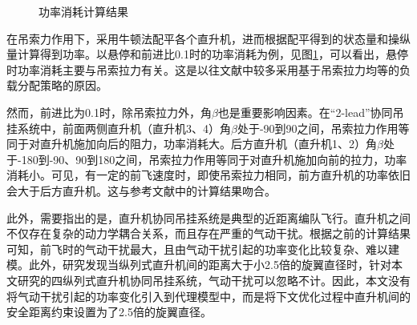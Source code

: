 \begin{figure}[!htb]
  \quad
  \caption{功率消耗计算结果}
  \label{fig:4_2_1}
\end{figure}

在吊索力作用下，采用牛顿法配平各个直升机，进而根据配平得到的状态量和操纵量计算得到功率。以悬停和前进比0.1时的功率消耗为例，见图\ref{fig:4_2_1}，可以看出，悬停时功率消耗主要与吊索拉力有关。这是以往文献中较多采用基于吊索拉力均等的负载分配策略的原因。

然而，前进比为0.1时，除吊索拉力外，角$\beta$也是重要影响因素。在“2-lead”协同吊挂系统中，前面两侧直升机（直升机3、4）角$\beta$处于-90\degree 到90\degree 之间，吊索拉力作用等同于对直升机施加向后的阻力，功率消耗大。后方直升机（直升机1、2）角$\beta$处于-180\degree 到-90\degree、90\degree 到180\degree 之间，吊索拉力作用等同于对直升机施加向前的拉力，功率消耗小。可见，有一定的前飞速度时，即使吊索拉力相同，前方直升机的功率依旧会大于后方直升机。这与参考文献\cite{enciu2017flight,song2013modeling}中的计算结果吻合。

此外，需要指出的是，直升机协同吊挂系统是典型的近距离编队飞行。直升机之间不仅存在复杂的动力学耦合关系，而且存在严重的气动干扰。根据之前的计算结果\cite{Duan2021Underreview}可知，前飞时的气动干扰最大，且由气动干扰引起的功率变化比较复杂、难以建模。此外，研究发现当纵列式直升机间的距离大于小2.5倍的旋翼直径时，针对本文研究的四纵列式直升机协同吊挂系统，气动干扰可以忽略不计。因此，本文没有将气动干扰引起的功率变化引入到代理模型中，而是将下文优化过程中直升机间的安全距离约束设置为了2.5倍的旋翼直径。
